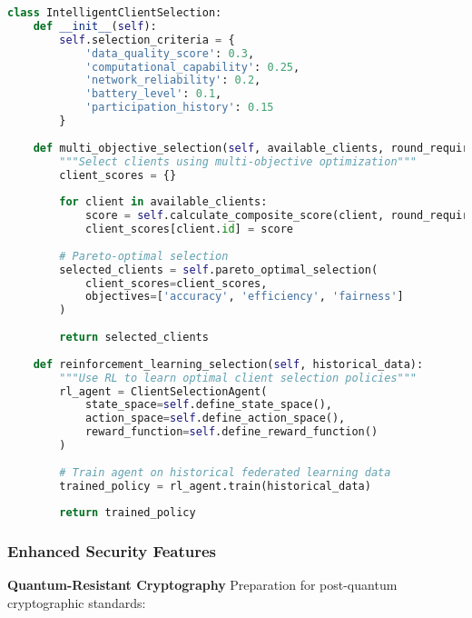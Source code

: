 \begin{lstlisting}[language=python, caption=Intelligent Client Selection]
class IntelligentClientSelection:
    def __init__(self):
        self.selection_criteria = {
            'data_quality_score': 0.3,
            'computational_capability': 0.25,
            'network_reliability': 0.2,
            'battery_level': 0.1,
            'participation_history': 0.15
        }
        
    def multi_objective_selection(self, available_clients, round_requirements):
        """Select clients using multi-objective optimization"""
        client_scores = {}
        
        for client in available_clients:
            score = self.calculate_composite_score(client, round_requirements)
            client_scores[client.id] = score
            
        # Pareto-optimal selection
        selected_clients = self.pareto_optimal_selection(
            client_scores=client_scores,
            objectives=['accuracy', 'efficiency', 'fairness']
        )
        
        return selected_clients
        
    def reinforcement_learning_selection(self, historical_data):
        """Use RL to learn optimal client selection policies"""
        rl_agent = ClientSelectionAgent(
            state_space=self.define_state_space(),
            action_space=self.define_action_space(),
            reward_function=self.define_reward_function()
        )
        
        # Train agent on historical federated learning data
        trained_policy = rl_agent.train(historical_data)
        
        return trained_policy
\end{lstlisting}

\subsubsection{Enhanced Security Features}

\textbf{Quantum-Resistant Cryptography}
Preparation for post-quantum cryptographic standards:

